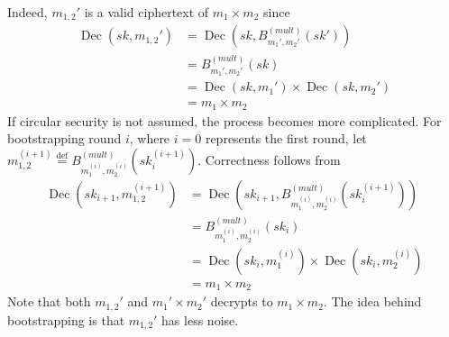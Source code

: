 Indeed, $m_{1,2}'$ is a valid ciphertext of $m_1 \times m_2$ since 
\begin{equation*}
    \begin{aligned}
        \operatorname{Dec}(sk, m_{1,2}') &= \operatorname{Dec}(sk, B_{m_1',m_2'}^{(mult)}(sk'))\\
        &= B_{m_1',m_2'}^{(mult)}(sk) \\
        &= \operatorname{Dec}(sk, m_1') \times \operatorname{Dec}(sk, m_2')\\
        &= m_1 \times m_2
    \end{aligned}
\end{equation*}
If circular security is not assumed, the process becomes more complicated. For bootstrapping round $i$, where $i = 0$ represents the first round, let $m_{1,2}^{(i+1)} \stackrel{\mathrm{def}}{=} B_{m_1^{(i)},m_2^{(i)}}^{(mult)}(sk_i^{(i+1)})$. Correctness follows from
\begin{equation*}
    \begin{aligned}
        \operatorname{Dec}(sk_{i+1}, m_{1,2}^{(i+1)}) &= \operatorname{Dec}(sk_{i+1}, B_{m_1^{(i)},m_2^{(i)}}^{(mult)}(sk_i^{(i+1)})) \\
        &= B_{m_1^{(i)},m_2^{(i)}}^{(mult)}(sk_i)\\
        &= \operatorname{Dec}(sk_i, m_1^{(i)}) \times \operatorname{Dec}(sk_i, m_2^{(i)})\\
        &= m_1 \times m_2
    \end{aligned}
\end{equation*}
Note that both $m_{1,2}'$ and $m_1' \times m_2'$ decrypts to $m_1 \times m_2$. The idea behind bootstrapping is that $m_{1,2}'$ has less noise.
